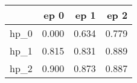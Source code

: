 \begin{tabular}{lrrr}
\toprule
{} &   ep 0 &   ep 1 &   ep 2 \\
\midrule
hp\_0 &  0.000 &  0.634 &  0.779 \\
hp\_1 &  0.815 &  0.831 &  0.889 \\
hp\_2 &  0.900 &  0.873 &  0.887 \\
\bottomrule
\end{tabular}
